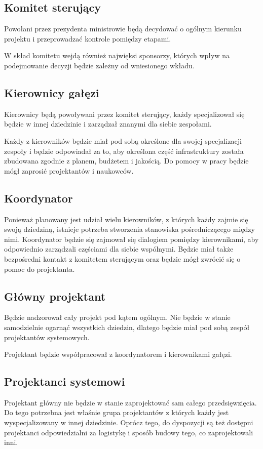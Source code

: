 \subsection{Komitet sterujący}
Powołani przez prezydenta ministrowie będą decydować o ogólnym kierunku projektu i przeprowadzać kontrole pomiędzy etapami.

W skład komitetu wejdą również najwięksi sponsorzy, których wpływ na podejmowanie decyzji będzie zależny od wniesionego wkładu.

\subsection{Kierownicy gałęzi}
Kierownicy będą powoływani przez komitet sterujący, każdy specjalizował się będzie w innej dziedzinie i zarządzał znanymi dla siebie zespołami.

Każdy z kierowników będzie miał pod sobą określone dla swojej specjalizacji zespoły i będzie odpowiadał za to, aby określona część infrastruktury została zbudowana zgodnie z planem, budżetem i jakością.
Do pomocy w pracy będzie mógł zaprosić projektantów i naukowców.

\subsection{Koordynator}
Ponieważ planowany jest udział wielu kierowników, z których każdy zajmie się swoją dziedziną, istnieje potrzeba stworzenia stanowiska pośredniczącego między nimi.
Koordynator będzie się zajmował się dialogiem pomiędzy kierownikami, aby odpowiednio zarządzali częściami dla siebie wspólnymi.
Będzie miał także bezpośredni kontakt z komitetem sterującym oraz będzie mógł zwrócić się o pomoc do projektanta.

\subsection{Główny projektant}
Będzie nadzorował cały projekt pod kątem ogólnym. 
Nie będzie w stanie samodzielnie ogarnąć wszystkich dziedzin, dlatego będzie miał pod sobą zespół projektantów systemowych.

Projektant będzie współpracował z koordynatorem i kierownikami gałęzi.

\subsection{Projektanci systemowi}
Projektant główny nie będzie w stanie zaprojektować sam całego przedsięwzięcia.
Do tego potrzebna jest właśnie grupa projektantów z których każdy jest wyspecjalizowany w innej dziedzinie.
Oprócz tego, do dyspozycji są też dostępni projektanci odpowiedzialni za logistykę i sposób budowy tego, co zaprojektowali inni.


